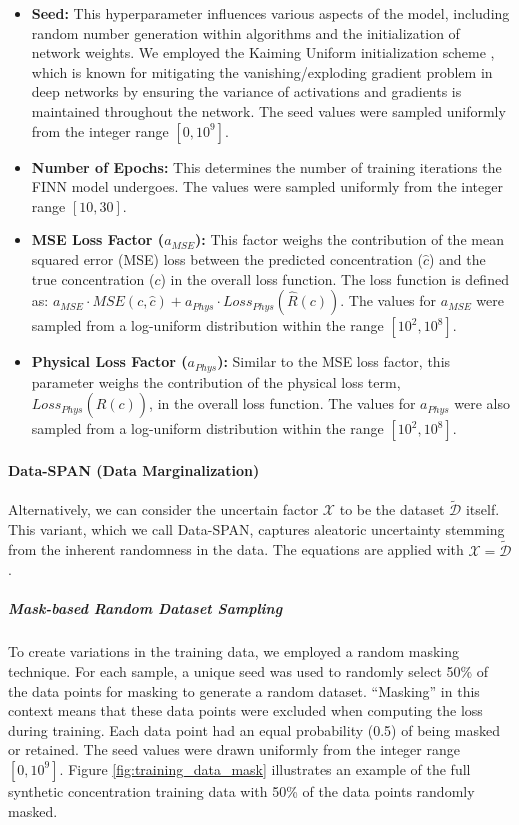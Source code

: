 \begin{itemize}
    \item \textbf{Seed:} This hyperparameter influences various aspects of the model, including random number generation within algorithms and the initialization of network weights. We employed the Kaiming Uniform initialization scheme \cite{he2015delving}, which is known for mitigating the vanishing/exploding gradient problem in deep networks by ensuring the variance of activations and gradients is maintained throughout the network. The seed values were sampled uniformly from the integer range $[0, 10^9]$.
    \item \textbf{Number of Epochs:} This determines the number of training iterations the FINN model undergoes. The values were sampled uniformly from the integer range $[10, 30]$.
    \item \textbf{MSE Loss Factor ($a_{MSE}$):} This factor weighs the contribution of the mean squared error (MSE) loss between the predicted concentration ($\hat{c}$) and the true concentration ($c$) in the overall loss function. The loss function is defined as: $a_{MSE} \cdot MSE(c, \hat{c}) + a_{Phys} \cdot Loss_{Phys}(\hat{R}(c))$. The values for $a_{MSE}$ were sampled from a log-uniform distribution within the range $[10^2, 10^8]$.
    \item \textbf{Physical Loss Factor ($a_{Phys}$):} Similar to the MSE loss factor, this parameter weighs the contribution of the physical loss term, $Loss_{Phys}(\hat{R}(c))$, in the overall loss function. The values for $a_{Phys}$ were also sampled from a log-uniform distribution within the range $[10^2, 10^8]$.
\end{itemize}



\paragraph{Data-SPAN (Data Marginalization)}

Alternatively, we can consider the uncertain factor $\mathcal{X}$ to be the dataset $\tilde{\mathcal{D}}$ itself. This variant, which we call Data-SPAN, captures aleatoric uncertainty stemming from the inherent randomness in the data. The equations are applied with $\mathcal{X} = \tilde{\mathcal{D}}$.


\subparagraph{Mask-based Random Dataset Sampling}

To create variations in the training data, we employed a random masking technique. For each sample, a unique seed was used to randomly select 50\% of the data points for masking to generate a random dataset. ``Masking'' in this context means that these data points were excluded when computing the loss during training. Each data point had an equal probability (0.5) of being masked or retained. The seed values were drawn uniformly from the integer range $[0, 10^9]$. Figure \ref{fig:training_data_mask} illustrates an example of the full synthetic concentration training data with 50\% of the data points randomly masked.

